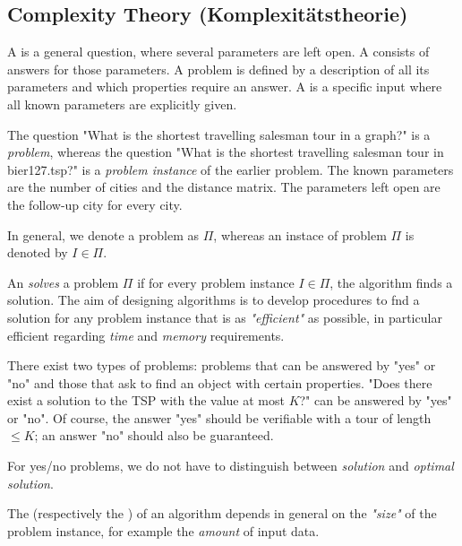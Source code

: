 \begin{lec}[2012-12-12]\end{lec}

\subsection*{Complexity Theory (Komplexitätstheorie)}

A  is a general question, where several parameters are left open. A  consists of answers for those parameters. A problem is defined by a description of all its parameters and which properties require an answer. A  is a specific input where all known parameters are explicitly given. 

The question "What is the shortest travelling salesman tour in a graph?" is a \emph{problem}, whereas the question "What is the shortest travelling salesman tour in bier127.tsp?" is a \emph{problem instance} of the earlier problem. The known parameters are the number of cities and the distance matrix. The parameters left open are the follow-up city for every city.

In general, we denote a problem as $\Pi$, whereas an instace of problem $\Pi$ is denoted by $I \in \Pi$.

An  \emph{solves} a problem $\Pi$ if for every problem instance $I \in \Pi$, the algorithm finds a solution. The aim of designing algorithms is to develop procedures to fnd a solution for any problem instance that is as \emph{"efficient"} as possible, in particular efficient regarding \emph{time} and \emph{memory} requirements.

There exist two types of problems: problems that can be answered by "yes" or "no" and those that ask to find an object with certain properties.
"Does there exist a solution to the TSP with the value at most $K$?" can be answered by "yes" or "no". Of course, the answer "yes" should be verifiable with a tour of length $\leq K$; an answer "no" should also be guaranteed.

For yes/no problems, we do not have to distinguish between \emph{solution} and \emph{optimal solution}.

The  (respectively the ) of an algorithm depends in general on the \emph{"size"} of the problem instance, for example the \emph{amount} of input data.

